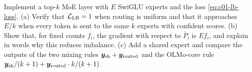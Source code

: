 \begin{exercise}\label{ex:c01-moe}
Implement a top-$k$ MoE layer with $E$ SwiGLU experts and the loss \eqref{eq:c01-lb-loss}.
(a) Verify that $\mathcal{L}_{\mathrm{LB}} = 1$ when routing is uniform and that it approaches
$E/k$ when every token is sent to the same $k$ experts with confident scores. (b) Show that,
for fixed counts $f_i$, the gradient with respect to $\bar{P}_i$ is $Ef_i$, and explain in
words why this reduces imbalance. (c) Add a shared expert and compare the outputs of the two
mixing rules $\bm{y}_{\mathrm{sh}} + \bm{y}_{\mathrm{routed}}$ and the OLMo-core rule
$\bm{y}_{\mathrm{sh}}/(k+1) + \bm{y}_{\mathrm{routed}}\cdot k/(k+1)$.
\end{exercise}
